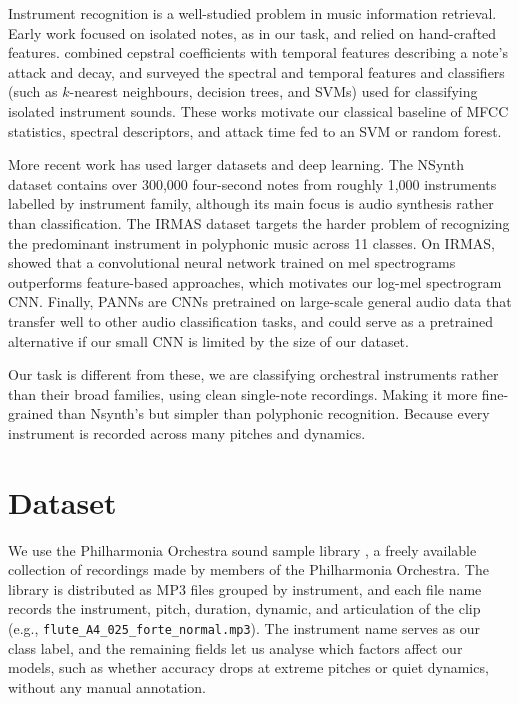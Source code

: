 \documentclass[11pt]{article}
\begin{document}
Instrument recognition is a well-studied problem in music information retrieval. Early work focused on isolated notes, as in our task, and relied on hand-crafted features. \citet{eronen2000musical} combined cepstral coefficients with temporal features describing a note's attack and decay, and \citet{herrera2003automatic} surveyed the spectral and temporal features and classifiers (such as $k$-nearest neighbours, decision trees, and SVMs) used for classifying isolated instrument sounds. These works motivate our classical baseline of MFCC statistics, spectral descriptors, and attack time fed to an SVM or random forest.

More recent work has used larger datasets and deep learning. The NSynth dataset \citep{engel2017nsynth} contains over 300,000 four-second notes from roughly 1,000 instruments labelled by instrument family, although its main focus is audio synthesis rather than classification. The IRMAS dataset \citep{bosch2012irmas} targets the harder problem of recognizing the predominant instrument in polyphonic music across 11 classes. On IRMAS, \citet{han2017deep} showed that a convolutional neural network trained on mel spectrograms outperforms feature-based approaches, which motivates our log-mel spectrogram CNN. Finally, PANNs \citep{kong2020panns} are CNNs pretrained on large-scale general audio data that transfer well to other audio classification tasks, and could serve as a pretrained alternative if our small CNN is limited by the size of our dataset.

Our task is different from these, we are classifying orchestral instruments rather than their broad families, using clean single-note recordings. Making it more fine-grained than Nsynth's but simpler than polyphonic recognition. Because every instrument is recorded across many pitches and dynamics. 
\section{Dataset}



We use the Philharmonia Orchestra sound sample library \citep{philharmonia_samples}, a freely available collection of recordings made by members of the Philharmonia Orchestra. The library is distributed as MP3 files grouped by instrument, and each file name records the instrument, pitch, duration, dynamic, and articulation of the clip (e.g., \texttt{flute\_A4\_025\_forte\_normal.mp3}). The instrument name serves as our class label, and the remaining fields let us analyse which factors affect our models, such as whether accuracy drops at extreme pitches or quiet dynamics, without any manual annotation.
\end{document}
